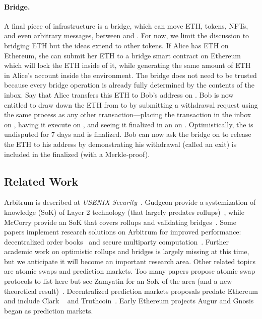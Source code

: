 \paragraph{Bridge.} A final piece of \layertwo infrastructure is a bridge, which can move ETH, tokens, NFTs, and even arbitrary messages, between \layerone and \layertwo. For now, we limit the discussion to bridging ETH but the ideas extend to other tokens. If Alice has ETH on Ethereum, she can submit her ETH to a bridge smart contract on Ethereum which will lock the ETH inside of it, while generating the same amount of ETH in Alice's account inside the \layertwo environment. The bridge does not need to be trusted because every bridge operation is already fully determined by the contents of the inbox. Say that Alice transfers this ETH to Bob's address on \layertwo. Bob is now entitled to draw down the ETH from \layertwo to \layerone by submitting a withdrawal request using the same process as any other \layertwo transaction---\ie placing the transaction in the inbox on \layerone, having it execute on \layertwo, and seeing it finalized in an \rblock on \layerone. Optimistically, the \rblock is undisputed for 7 days and is finalized. Bob can now ask the bridge on \layerone to release the ETH to his address by demonstrating his withdrawal (called an exit) is included in the finalized \rblock (\eg with a Merkle-proof).

\subsection{Related Work} 

Arbitrum is described at \textit{USENIX Security}~\cite{kalodner2018arbitrum}. Gudgeon \etal provide a systemization of knowledge (SoK) of Layer 2 technology (that largely predates rollups)~\cite{gudgeon2019sok}, while McCorry \etal provide an SoK that covers rollups and validating bridges~\cite{mccorry2021sok}. Some papers implement research solutions on Arbitrum for improved performance:  decentralized order books~\cite{moosavi2021lissy} and secure multiparty computation~\cite{demirag2021absentia}. Further academic work on optimistic rollups and bridges is largely missing at this time, but we anticipate it will become an important research area.  Other related topics are atomic swaps and prediction markets. Too many papers propose atomic swap protocols to list here but see Zamyatin \etal for an SoK of the area (and a new theoretical result)~\cite{zamyatin2021sok}. Decentralized prediction markets proposals predate Ethereum and include Clark \etal~\cite{clark2014decentralizing} and Truthcoin~\cite{sztorc2015truthcoin}. Early Ethereum projects Augur and Gnosis began as prediction markets. 

